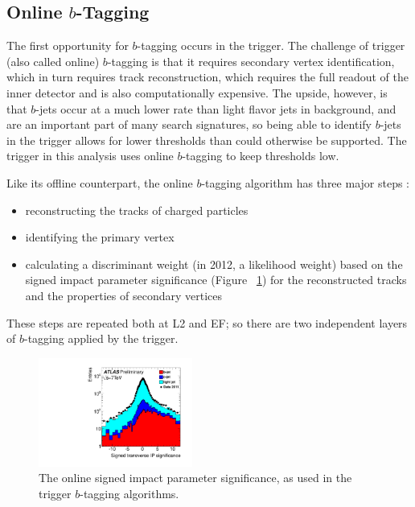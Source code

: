 \subsection{Online $b$-Tagging}
The first opportunity for $b$-tagging occurs in the trigger.  The challenge of trigger (also called online)
$b$-tagging is that it requires secondary vertex identification, which in turn requires track reconstruction,
which requires the full readout of the inner detector and is also computationally expensive.  The upside,
however, is that $b$-jets occur at a much lower rate than light flavor jets in background, and are an important
part of many search signatures, so being able to identify $b$-jets in the trigger allows for lower
thresholds than could otherwise be supported.  The trigger in this analysis uses online $b$-tagging to keep
thresholds low. 

Like its offline counterpart, the online $b$-tagging algorithm has three major steps \cite{online_btag_2}:
\begin{itemize}
    \item reconstructing the tracks of charged particles
    \item identifying the primary vertex
    \item calculating a discriminant weight (in 2012, a likelihood weight) based on the signed impact parameter significance 
    (Figure ~\ref{fig:ip_sig}) for the reconstructed tracks and the properties of secondary vertices
\end{itemize}

These steps are repeated both at L2 and EF; so there are two independent layers of $b$-tagging applied by the
trigger.

\begin{figure}
    \center
   \includegraphics[width=0.45\textwidth]{ReconstructionPerformance/online_btag_IP.pdf}
   \caption{The online signed impact parameter significance, as used in the trigger $b$-tagging algorithms. \label{fig:ip_sig} }
\end{figure}



